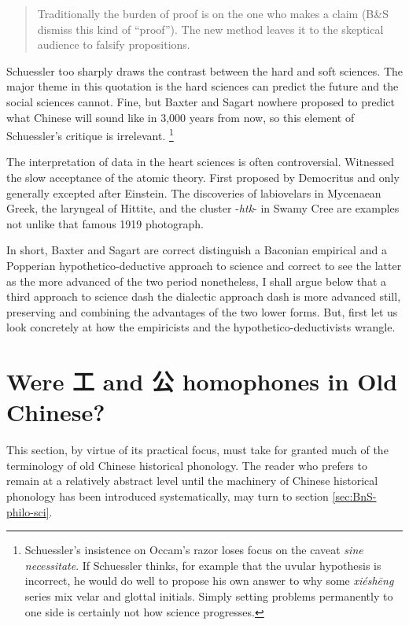 \begin{quote}
Traditionally the burden
of proof is on the one who makes a claim (B\&S dismiss this kind of ``proof''). The
new method leaves it to the skeptical audience to falsify propositions. \citep[577]{Schuessler2015BSrv}
\end{quote}

\noindent Schuessler too sharply draws the contrast between the hard and soft sciences. 
The major theme in this quotation is the hard sciences can predict the future and the social sciences cannot. Fine, but Baxter and Sagart nowhere proposed to predict what Chinese will sound like in 3,000 years from now, so this element of Schuessler's critique is irrelevant.
\footnote{Schuessler's insistence on Occam's razor loses focus on the caveat \textit{sine necessitate}. If Schuessler thinks, for example that the uvular hypothesis is incorrect, he would do well to propose his own answer to why some \textit{xiéshēng} series mix velar and glottal initials. Simply setting problems permanently to one side is certainly not how science progresses.}

The interpretation of data in the heart sciences is often controversial. Witnessed the slow acceptance of the atomic theory. First proposed by Democritus and only generally excepted after Einstein. The discoveries of labiovelars in Mycenaean Greek, the laryngeal of Hittite, and the cluster -\textit{htk}- in Swamy Cree are examples not unlike that famous 1919 photograph.

In short, Baxter and Sagart are correct distinguish a Baconian empirical and a Popperian hypothetico-deductive approach to science and correct to see the latter as the more advanced of the two period nonetheless, I shall argue below that a third approach to science dash the dialectic approach dash is more advanced still, preserving and combining the advantages of the two lower forms. But, first let us look concretely at how the empiricists and the hypothetico-deductivists wrangle.


\section{Were 工  and 公 homophones in Old Chinese?}

This section, by virtue of its practical focus, must take for granted much of the terminology of old Chinese historical phonology. The reader who prefers to remain at a relatively abstract level until the machinery of Chinese historical phonology has been introduced systematically, may turn to section 
\ref{sec:BnS-philo-sci}.

